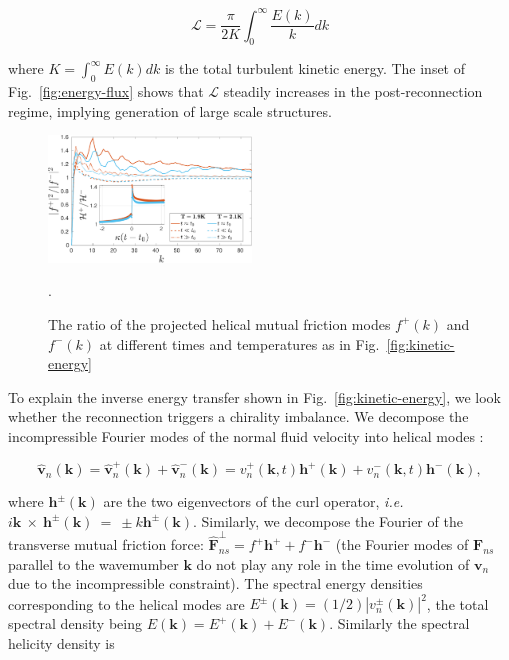 \documentclass[%
 reprint,
 amsmath,amssymb,
 aps,
 prl,
]{revtex4-2}
\def \k{\mathbf{k}}
\def \h{\mathbf{h}}
\begin{document}
\begin{equation}
    \mathcal{L} = \frac{\pi}{2 K}\int_0^{\infty}\frac{E(k)}{k}dk
\end{equation}

\noindent
where $K=\int_0^{\infty}\!\!E(k)dk$ is the total turbulent kinetic
energy. The inset of Fig.~\ref{fig:energy-flux} shows that
$\mathcal{L}$ steadily increases in the post-reconnection regime,
implying generation of large scale structures. 

\begin{figure}[b]
    \centering
    \includegraphics*[width=0.48\textwidth]{fmfDecompFig.pdf}
    \caption{The ratio of the projected helical mutual friction modes $f^+(k)$ and $f^-(k)$
at different times and temperatures as in Fig.~\ref{fig:kinetic-energy}}.
    \label{fig:mutual-friction-decomp}
\end{figure}

To explain the inverse energy transfer shown in Fig.~\ref{fig:kinetic-energy},
we look whether the reconnection triggers a chirality imbalance. 
We decompose the incompressible Fourier modes of the normal fluid velocity 
into helical modes \cite{waleffe-1992}:

\begin{equation}
\hat{\mathbf{v}}_n (\k) = \hat{\mathbf{v}}_n^+(\k) +\hat{\mathbf{v}}_n^-(\k)=
 v_n^+(\mathbf{k},t) \mathbf{h}^+(\mathbf{k})+v_n^-(\mathbf{k},t) \mathbf{h}^-(\mathbf{k}),
\end{equation}

\noindent 
where $\mathbf{h}^\pm (\mathbf{k})$ are the two eigenvectors of the curl 
operator, \textit{i.e.} $i\k~\times~\h^{\pm}(\k)~=~\pm k \h^{\pm}(\k)$. 
Similarly, we decompose the Fourier of the transverse mutual friction force:
$\hat{\mathbf{F}}_{ns}^{\perp} = f^+ \mathbf{h}^+ + f^- \mathbf{h}^-$
(the  Fourier modes of $\mathbf{F}_{ns}$ parallel to the wavemumber 
$\k$ do not play any role in the time evolution of $\mathbf{v}_n$ 
due to the incompressible constraint). 
The spectral energy densities corresponding to the helical modes are
$E^{\pm}(\k) = (1/2) |v_n^\pm(\k)|^2$, the total spectral density 
being $E(\k) = E^{+}(\k) + E^{-}(\k)$. Similarly the spectral helicity 
density is 
\end{document}
